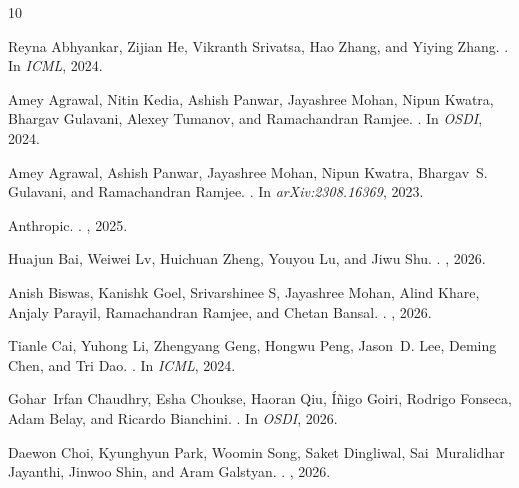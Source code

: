\begin{thebibliography}{10}

Reyna Abhyankar, Zijian He, Vikranth Srivatsa, Hao Zhang, and Yiying Zhang.
.
\newblock In {\em ICML}, 2024.

Amey Agrawal, Nitin Kedia, Ashish Panwar, Jayashree Mohan, Nipun Kwatra,
  Bhargav Gulavani, Alexey Tumanov, and Ramachandran Ramjee.
.
\newblock In {\em OSDI}, 2024.

Amey Agrawal, Ashish Panwar, Jayashree Mohan, Nipun Kwatra, Bhargav~S.
  Gulavani, and Ramachandran Ramjee.
.
\newblock In {\em arXiv:2308.16369}, 2023.

{Anthropic}.
.
, 2025.

Huajun Bai, Weiwei Lv, Huichuan Zheng, Youyou Lu, and Jiwu Shu.
.
, 2026.

Anish Biswas, Kanishk Goel, Srivarshinee S, Jayashree Mohan, Alind Khare,
  Anjaly Parayil, Ramachandran Ramjee, and Chetan Bansal.
.
, 2026.

Tianle Cai, Yuhong Li, Zhengyang Geng, Hongwu Peng, Jason~D. Lee, Deming Chen,
  and Tri Dao.
.
\newblock In {\em ICML}, 2024.

Gohar~Irfan Chaudhry, Esha Choukse, Haoran Qiu, {\'I}{\~n}igo Goiri, Rodrigo
  Fonseca, Adam Belay, and Ricardo Bianchini.
.
\newblock In {\em OSDI}, 2026.

Daewon Choi, Kyunghyun Park, Woomin Song, Saket Dingliwal, Sai~Muralidhar
  Jayanthi, Jinwoo Shin, and Aram Galstyan.
.
, 2026.


\end{thebibliography}
